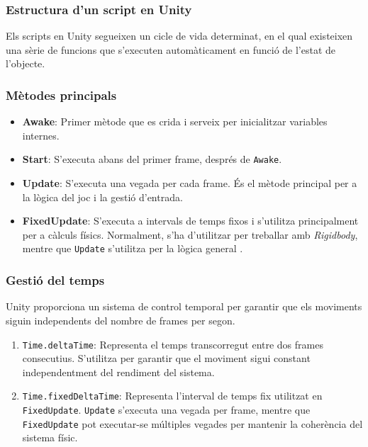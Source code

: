 \documentclass[a4paper,11pt,DIV=13,headings=normal,abstract=true,twoside=semi]{article}
\begin{document}
\subsubsection{Estructura d'un script en Unity}

Els scripts en Unity segueixen un cicle de vida determinat, en el qual existeixen una sèrie de funcions que s'executen automàticament en funció de l'estat de l'objecte.

\subsubsection*{Mètodes principals}

\begin{itemize}

\item \textbf{Awake}: Primer mètode que es crida i serveix per inicialitzar variables internes.

\item \textbf{Start}:  
S'executa abans del primer frame, després de \texttt{Awake}\cite{UnityExecutionOrder}.

\item \textbf{Update}:  
S'executa una vegada per cada frame. És el mètode principal per a la lògica del joc i la gestió d'entrada.

\item \textbf{FixedUpdate}:  
S'executa a intervals de temps fixos i s'utilitza principalment per a càlculs físics. Normalment, s'ha d'utilitzar per treballar amb \textit{Rigidbody}, mentre que \texttt{Update} s'utilitza per la lògica general \cite{UnityUpdate}.

\end{itemize}




\subsubsection{Gestió del temps}

Unity proporciona un sistema de control temporal \cite{UnityTime} per garantir que els moviments siguin independents del nombre de frames per segon.

\begin{enumerate}
    \item \texttt{Time.deltaTime}: Representa el temps transcorregut entre dos frames consecutius. S'utilitza per garantir que el moviment sigui constant independentment del rendiment del sistema.
    \item \texttt{Time.fixedDeltaTime}: Representa l'interval de temps fix utilitzat en \texttt{FixedUpdate}. \texttt{Update} s'executa una vegada per frame, mentre que \texttt{FixedUpdate} pot executar-se múltiples vegades per mantenir la coherència del sistema físic. \cite{UnityUpdate}

\end{enumerate}
\end{document}

